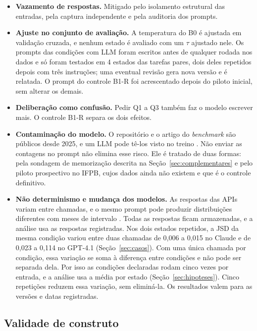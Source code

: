 \documentclass[12pt,oneside,a4paper,chapter=TITLE,english,brazil]{abntex2}
\begin{document}
\begin{itemize}
\item \textbf{Vazamento de respostas.} Mitigado pelo isolamento estrutural das entradas, pela captura independente e pela auditoria dos prompts.
\item \textbf{Ajuste no conjunto de avaliação.} A temperatura do B0 é ajustada em validação cruzada, e nenhum estado é avaliado com um $\tau$ ajustado nele. Os prompts das condições com LLM foram escritos antes de qualquer rodada nos dados e só foram testados em 4 estados das tarefas pares, dois deles repetidos depois com três instruções; uma eventual revisão gera nova versão e é relatada. O prompt do controle B1-R foi acrescentado depois do piloto inicial, sem alterar os demais.
\item \textbf{Deliberação como confusão.} Pedir Q1 a Q3 também faz o modelo escrever mais. O controle B1-R separa os dois efeitos.
\item \textbf{Contaminação do modelo.} O repositório e o artigo do \textit{benchmark} são públicos desde 2025, e um LLM pode tê-los visto no treino \cite{sainz2023contamination}. Não enviar as contagens no prompt não elimina esse risco. Ele é tratado de duas formas: pela sondagem de memorização descrita na Seção~\ref{sec:complementares} e pelo piloto prospectivo no IFPB, cujos dados ainda não existem e que é o controle definitivo.
\item \textbf{Não determinismo e mudança dos modelos.} As respostas das APIs variam entre chamadas, e o mesmo prompt pode produzir distribuições diferentes com meses de intervalo \cite{bisbee2024synthetic}. Todas as respostas ficam armazenadas, e a análise usa as respostas registradas. Nos dois estados repetidos, a JSD da mesma condição variou entre duas chamadas de 0,006 a 0,015 no Claude e de 0,023 a 0,114 no GPT-4.1 (Seção~\ref{sec:casos}). Com uma única chamada por condição, essa variação se soma à diferença entre condições e não pode ser separada dela. Por isso as condições declaradas rodam cinco vezes por entrada, e a análise usa a média por estado (Seção~\ref{sec:hipoteses}). Cinco repetições reduzem essa variação, sem eliminá-la. Os resultados valem para as versões e datas registradas.
\end{itemize}

\subsection{Validade de construto}
\end{document}
